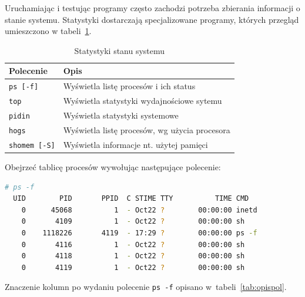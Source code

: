 \documentclass[11pt,twoside,a4paper]{article}
\begin{document}
\begin{example}

Uruchamiając i testując programy często zachodzi potrzeba zbierania informacji o stanie systemu. Statystyki dostarczają specjalizowane programy, których przegląd umieszczono w tabeli~\ref{tab:statystyki}. 

\begin{table}[h!]
\centering
\caption{Statystyki stanu systemu}
\setlength{\arrayrulewidth}{1pt}
\setlength{\tabcolsep}{6pt}
\renewcommand{\arraystretch}{1.2}
\begin{tabular}{ |p{}|p{}|}
\hline \rowcolor{gray}
\textbf{Polecenie} & \textbf{Opis} \\ \hline
\mbox{\lstinline{ps [-f]}} & Wyświetla listę procesów i ich status \\ \hline 
\mbox{\lstinline{top}} & Wyświetla statystyki wydajnościowe sytemu \\ \hline 
\mbox{\lstinline{pidin}}  & Wyświetla statystyki systemowe \\ \hline
\mbox{\lstinline{hogs}}  & Wyświetla listę procesów, wg użycia procesora \\ \hline
\mbox{\lstinline{shomem [-S]}}  & Wyświetla informacje nt. użytej pamięci \\ \hline
\end{tabular}
\label{tab:statystyki}
\end{table}

Obejrzeć tablicę procesów wywołując następujące polecenie: 
\begin{lstlisting}[language=bash,deletekeywords={ps}] 
# ps -f
  UID        PID       PPID  C STIME TTY          TIME CMD
    0      45068          1  - Oct22 ?        00:00:00 inetd
    0       4109          1  - Oct22 ?        00:00:00 sh
    0    1118226       4119  - 17:29 ?        00:00:00 ps -f
    0       4116          1  - Oct22 ?        00:00:00 sh
    0       4118          1  - Oct22 ?        00:00:00 sh
    0       4119          1  - Oct22 ?        00:00:00 sh
\end{lstlisting}

Znaczenie kolumn po wydaniu polecenie \lstinline{ps -f} opisano w~tabeli~\ref{tab:opispol}.


\end{example}
\end{document}
